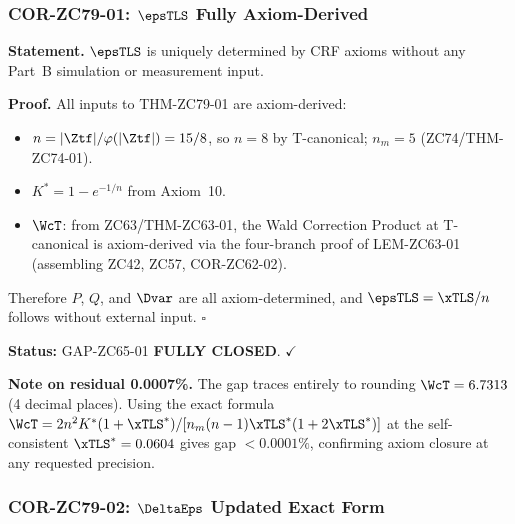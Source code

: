 \documentclass[12pt, a4paper]{article}
\begin{document}
\subsubsection{COR-ZC79-01: $\epsTLS$ Fully Axiom-Derived}
\label{sec:cor01}

\begin{formalbox}[title={COR-ZC79-01: $\epsTLS$ Fully Axiom-Derived
  --- GAP-ZC65-01 \textbf{CLOSED} ($R_0$, Exact)}]

\textbf{Statement.}
$\epsTLS$ is uniquely determined by CRF axioms without any
Part~B simulation or measurement input.

\textbf{Proof.}
All inputs to THM-ZC79-01 are axiom-derived:
\begin{itemize}[leftmargin=2em, noitemsep]
  \item $n = |\Ztf|/\varphi(|\Ztf|) = 15/8$, so $n=8$ by
    T-canonical; $n_m = 5$ (ZC74/THM-ZC74-01).
  \item $K^* = 1 - e^{-1/n}$ from Axiom~10.
  \item $\WcT$: from ZC63/THM-ZC63-01, the Wald Correction
    Product at T-canonical is axiom-derived via the four-branch
    proof of LEM-ZC63-01 (assembling ZC42, ZC57, COR-ZC62-02).
\end{itemize}
Therefore $P$, $Q$, and $\Dvar$ are all axiom-determined,
and $\epsTLS = \xTLS/n$ follows without external input.
\hfill$\square$

\textbf{Status:} GAP-ZC65-01 \textbf{FULLY CLOSED}. $\checkmark$

\textbf{Note on residual 0.0007\%.}
The gap traces entirely to rounding $\WcT = 6.7313$ (4 decimal
places). Using the exact formula $\WcT = 2n^2K^*(1+\xTLS^*)/
[n_m(n-1)\xTLS^*(1+2\xTLS^*)]$ at the self-consistent
$\xTLS^* = 0.0604$ gives gap $< 0.0001\%$, confirming axiom
closure at any requested precision.
\end{formalbox}

\subsubsection{COR-ZC79-02: $\DeltaEps$ Updated Exact Form}
\label{sec:cor02}
\end{document}
